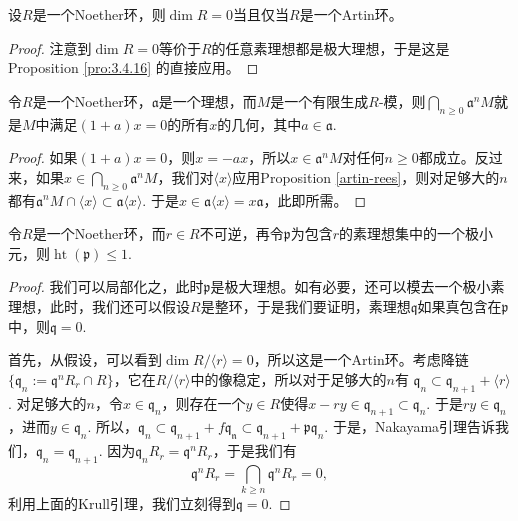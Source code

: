 \begin{pro}
设$R$是一个Noether环，则$\dim R=0$当且仅当$R$是一个Artin环。
\end{pro}

\begin{proof}
注意到$\dim R=0$等价于$R$的任意素理想都是极大理想，于是这是Proposition \ref{pro:3.4.16} 的直接应用。
\end{proof}


\begin{lem}[Krull]
令$R$是一个Noether环，$\mathfrak a$是一个理想，而$M$是一个有限生成$R$-模，则$\bigcap_{n\geq 0}\mathfrak a^nM$就是$M$中满足$(1+a)x=0$的所有$x$的几何，其中$a\in \mathfrak a$.
\end{lem}

\begin{proof}
如果$(1+a)x=0$，则$x=-ax$，所以$x\in \mathfrak a^n M$对任何$n\geq 0$都成立。反过来，如果$x \in \bigcap_{n\geq 0}\mathfrak a^nM$，我们对$\langle x\rangle$应用Proposition \ref{artin-rees}，则对足够大的$n$都有$\mathfrak a^n M\cap \langle x\rangle \subset \mathfrak a \langle x\rangle$. 于是$x\in \mathfrak a \langle x\rangle=x\mathfrak a$，此即所需。
\end{proof}

\begin{thm}[Krull主理想定理]
令$R$是一个Noether环，而$r\in R$不可逆，再令$\mathfrak p$为包含$r$的素理想集中的一个极小元，则$\operatorname{ht}(\mathfrak p)\leq 1$.
\end{thm}

\begin{proof}
我们可以局部化之，此时$\mathfrak p$是极大理想。如有必要，还可以模去一个极小素理想，此时，我们还可以假设$R$是整环，于是我们要证明，素理想$\mathfrak q$如果真包含在$\mathfrak p$中，则$\mathfrak q = 0$.

首先，从假设，可以看到$\dim R/\langle r\rangle=0$，所以这是一个Artin环。考虑降链$\{\mathfrak q_n:=\mathfrak q^n R_r\cap R\}$，它在$R/\langle r\rangle$中的像稳定，所以对于足够大的$n$有
$\mathfrak q_n\subset \mathfrak q_{n+1}+\langle r\rangle$. 
对足够大的$n$，令$x\in \mathfrak q_n$，则存在一个$y\in R$使得$x-ry\in \mathfrak q_{n+1}\subset \mathfrak q_n$. 于是$ry\in \mathfrak q_n$，进而$y \in \mathfrak q_n$.
所以，$\mathfrak q_n\subset \mathfrak q_{n+1}+f\mathfrak{q_n}\subset \mathfrak q_{n+1}+\mathfrak p \mathfrak q_n$. 于是，Nakayama引理告诉我们，$\mathfrak q_n=\mathfrak q_{n+1}$. 因为$\mathfrak q_n R_r=\mathfrak q^n R_r$，于是我们有
\[
	\mathfrak q^n R_r=\bigcap_{k\geq n}\mathfrak q^n R_r=0,
\]
利用上面的Krull引理，我们立刻得到$\mathfrak q=0$.
\end{proof}

